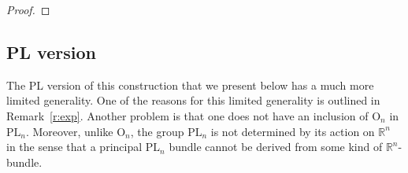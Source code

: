 \documentclass[11pt]{amsart}
\theoremstyle{definition}
\newcommand{\R}{{\mathbb R}}
\newcommand{\Diff}{\mathrm{Diff}}
\newcommand{\Homeo}{\mathrm{Homeo}}
\newcommand{\pdHomeo}{\mathrm{pdHomeo}}
\newcommand{\Smooth}{\mathrm{Smooth}}
\newcommand{\PL}{\mathrm{PL}}
\newcommand{\TOP}{\mathrm{TOP}}
\newcommand{\OO}{\mathrm{O}}
\newcommand{\PD}{\mathrm{PD}}
\newcommand{\hofiber}{\mathrm{hofiber}}
\newcommand\rth{\refstepcounter{equation}}
\newcommand\numb{\rth{\rm \theequation}}
\numberwithin{equation}{section}
\begin{document}
\begin{proof}
%
\end{proof}





\subsection{PL version}\label{ss:pl_fr_homeo}
The PL version of this construction that we present below has a much more limited generality. One of the reasons for
this limited generality is outlined in Remark~\ref{r:exp}. Another  problem is
that one does not have an inclusion of $\OO_n$ in $\PL_n$. Moreover, unlike $\OO_n$, the group $\PL_n$ is not determined by its action on $\R^n$ in the sense 
that a principal $\PL_n$ bundle cannot be derived from some kind of $\R^n$-bundle.
\end{document}
